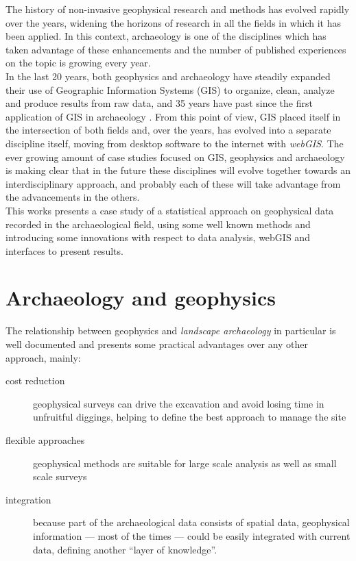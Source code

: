     The history of non-invasive geophysical research and methods has evolved rapidly over the years, widening the horizons of research in all the fields in which it has been applied. In this context, archaeology is one of the disciplines which has taken advantage of these enhancements and the number of published experiences on the topic is growing every year.\\
    In the last 20 years, both geophysics and archaeology have steadily expanded their use of Geographic Information Systems (GIS) to organize, clean, analyze and produce results from raw data, and 35 years have past since the first application of GIS in archaeology \cite[pp.~2--3]{kvamme1995}. From this point of view, GIS placed itself in the intersection of both fields and, over the years, has evolved into a separate discipline itself, moving from desktop software to the internet with \emph{webGIS}. The ever growing amount of case studies focused on GIS, geophysics and archaeology is making clear that in the future these disciplines will evolve together towards an interdisciplinary approach, and probably each of these will take advantage from the advancements in the others.\\
    This works presents a case study of a statistical approach on geophysical data recorded in the archaeological field, using some well known methods and introducing some innovations with respect to data analysis, webGIS and interfaces to present results. 

    \section{Archaeology and geophysics}
    \label{sec:arch-geoph}
        The relationship between geophysics and \emph{landscape archaeology} in particular is well documented and presents some practical advantages over any other approach, mainly:
        \begin{description}
            \item[cost reduction] geophysical surveys can drive the excavation and avoid losing time in unfruitful diggings, helping to define the best approach to manage the site
            \item[flexible approaches] geophysical methods are suitable for large scale analysis as well as small scale surveys
            \item[integration] because part of the archaeological data consists of spatial data, geophysical information --- most of the times --- could be easily integrated with current data, defining another ``layer of knowledge''.
        \end{description}


